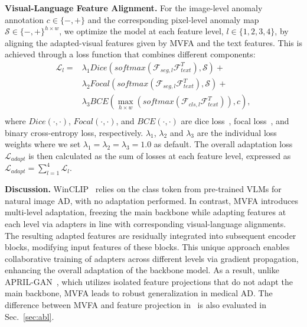 \noindent\textbf{Visual-Language Feature Alignment.} 
For the image-level anomaly annotation $c \in \{-,+\}$ and the corresponding pixel-level anomaly map $\mathcal{S} \in \{-,+\}^{h\times w}$, we optimize the model at each feature level, $l \in \{1,2,3,4\}$, by aligning the adapted-visual features given by MVFA and the text features. This is achieved through a loss function that combines different components: 
\begin{equation}
\begin{aligned}
    \mathcal{L}_l = &\lambda_1\textit{Dice}(\textit{softmax}(\mathcal{F}_{seg,l} \mathcal{F}_{text}^{T}), \mathcal{S})+ \\
    &\lambda_2\textit{Focal}(\textit{softmax}(\mathcal{F}_{seg,l} \mathcal{F}_{text}^{T}), \mathcal{S})+\\
    &\lambda_3\textit{BCE}(\max_{h\times w}(\textit{softmax}(\mathcal{F}_{cls,l} \mathcal{F}_{text}^{T})),c),\\
\end{aligned}
\end{equation}
where $\textit{Dice}(\cdot,\cdot)$, $\textit{Focal}(\cdot,\cdot)$, and $\textit{BCE}(\cdot,\cdot)$ are dice loss~\cite{milletari2016v}, focal loss~\cite{lin2017focal}, and binary cross-entropy loss, respectively. $\lambda_1$, $\lambda_2$ and $\lambda_3$ are the individual loss weights where we set $\lambda_1=\lambda_2=\lambda_3=1.0$ as default. The overall adaptation loss $\mathcal{L}_{adapt}$ is then calculated as the sum of losses at each feature level, expressed as $\mathcal{L}_{adapt} = \sum_{l=1}^4 \mathcal{L}_l$. 

\noindent\textbf{Discussion.} 
WinCLIP~\cite{winclip} relies on the class token from pre-trained VLMs for natural image AD, with no adaptation performed. In contrast, MVFA introduces multi-level adaptation, freezing the main backbone while adapting features at each level via adapters in line with corresponding visual-language alignments. The resulting adapted features are residually integrated into subsequent encoder blocks, modifying input features of these blocks. This unique approach enables collaborative training of adapters across different levels via gradient propagation, enhancing the overall adaptation of the backbone model. As a result, unlike APRIL-GAN~\cite{chen2023zero}, which utilizes isolated feature projections that do not adapt the main backbone, MVFA leads to robust generalization in medical AD. The difference between MVFA and feature projection in~\cite{chen2023zero} is also evaluated in Sec.~\ref{sec:abl}.

